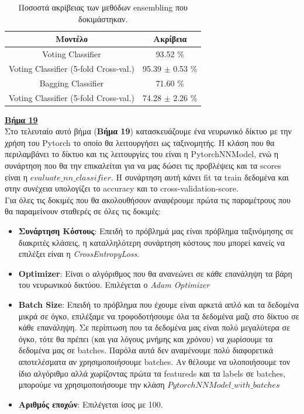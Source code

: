 \documentclass[11pt]{article} %
\begin{document}
\begin{table}[h]
\begin{center}
\begin{tabular}{c c }
\hline\hline
Μοντέλο & Ακρίβεια\\
\hline
Voting Classifier & 93.52 \%\\ 
Voting Classifier (5-fold Cross-val.) & 95.39 $\pm$  0.53 \%\\  
Bagging Classifier & 71.60 \%\\
Voting Classifier (5-fold Cross-val.) & 74.28 $\pm$ 2.26 \%\\
\hline 
\end{tabular}
\caption{Ποσοστά ακρίβειας των μεθόδων ensembling που δοκιμάστηκαν.}
\label{tab:ansemble-accuracies}
\end{center}
\end{table}

\underline{\textbf{Βήμα 19}}\\

Στο τελευταίο αυτό βήμα (\textbf{Βήμα 19}) κατασκευάζουμε ένα νευρωνικό δίκτυο με την χρήση του Pytorch το οποίο θα λειτουργήσει ως ταξινομητής. Η κλάση που θα περιλαμβάνει το δίκτυο και τις λειτουργίες του είναι η PytorchNNModel, ενώ η συνάρτηση που θα την επικαλείται για να μας δώσει τις προβλέψεις και τα scores είναι η $evaluate\_nn\_classifier$. Η συνάρτηση αυτή κάνει fit τα train δεδομένα και στην συνέχεια υπολογίζει το accuracy και το cross-validation-score.\\

 Για όλες τις δοκιμές που θα ακολουθήσουν αναφέρουμε πρώτα τις παραμέτρους που θα παραμείνουν σταθερές σε όλες τις δοκιμές:

\begin{itemize}
\item \textbf{Συνάρτηση Κόστους}: Επειδή το πρόβλημά μας είναι πρόβλημα ταξινόμησης σε διακριτές κλάσεις, η καταλληλότερη συνάρτηση κόστους που μπορεί κανείς να επιλέξει είναι η \textit{CrossEntropyLoss}.\\
\item \textbf{Optimizer}: Είναι ο αλγόριθμος που θα ανανεώνει σε κάθε επανάληψη τα βάρη του νευρωνικού δικτύου. Επιλέγεται ο \textit{Adam Optimizer}\\
\item \textbf{Batch Size}: Επειδή το πρόβλημα που έχουμε είναι αρκετά απλό και τα δεδομένα μικρά σε όγκο, επιλέξαμε να τροφοδοτήσουμε όλα τα δεδομένα μαζι στο δίκτυο σε κάθε επανάληψη. Σε περίπτωση που τα δεδομένα μας είναι πολύ μεγαλύτερα σε όγκο, τότε θα πρέπει (και για λόγους μνήμης και χρόνου) να χωρίσουμε τα δεδομένα μας σε batches. Παρόλα αυτά δεν αναμένουμε πολύ διαφορετικά αποτελέσματα αν χρησιμοποιήσουμε batches. Αν θέλουμε να υλοποιήσουμε τον ίδιο αλγόριθμο αλλά χωρίζοντας πρώτα τα featureds και τα labels σε batches, μπορούμε να χρησιμοποιήσουμε την κλάση $PytorchNNModel\_with\_batches$\\
\item \textbf{Αριθμός εποχών}: Επιλέγεται ίσος με 100. \\
\end{itemize}
\end{document}
